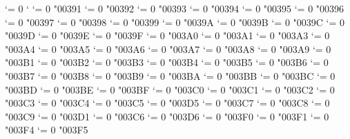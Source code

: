 {  \Umathcode `\z = 0 \alphafam `\z
  \Umathcode `\Α = 0 \alphafam "00391
  \Umathcode `\Β = 0 \alphafam "00392
  \Umathcode `\Γ = 0 \alphafam "00393
  \Umathcode `\Δ = 0 \alphafam "00394
  \Umathcode `\Ε = 0 \alphafam "00395
  \Umathcode `\Ζ = 0 \alphafam "00396
  \Umathcode `\Η = 0 \alphafam "00397
  \Umathcode `\Θ = 0 \alphafam "00398
  \Umathcode `\Ι = 0 \alphafam "00399
  \Umathcode `\Κ = 0 \alphafam "0039A
  \Umathcode `\Λ = 0 \alphafam "0039B
  \Umathcode `\Μ = 0 \alphafam "0039C
  \Umathcode `\Ν = 0 \alphafam "0039D
  \Umathcode `\Ξ = 0 \alphafam "0039E
  \Umathcode `\Ο = 0 \alphafam "0039F
  \Umathcode `\Π = 0 \alphafam "003A0
  \Umathcode `\Ρ = 0 \alphafam "003A1
  \Umathcode `\Σ = 0 \alphafam "003A3
  \Umathcode `\Τ = 0 \alphafam "003A4
  \Umathcode `\Υ = 0 \alphafam "003A5
  \Umathcode `\Φ = 0 \alphafam "003A6
  \Umathcode `\Χ = 0 \alphafam "003A7
  \Umathcode `\Ψ = 0 \alphafam "003A8
  \Umathcode `\Ω = 0 \alphafam "003A9
  \Umathcode `\α = 0 \alphafam "003B1
  \Umathcode `\β = 0 \alphafam "003B2
  \Umathcode `\γ = 0 \alphafam "003B3
  \Umathcode `\δ = 0 \alphafam "003B4
  \Umathcode `\ε = 0 \alphafam "003B5
  \Umathcode `\ζ = 0 \alphafam "003B6
  \Umathcode `\η = 0 \alphafam "003B7
  \Umathcode `\θ = 0 \alphafam "003B8
  \Umathcode `\ι = 0 \alphafam "003B9
  \Umathcode `\κ = 0 \alphafam "003BA
  \Umathcode `\λ = 0 \alphafam "003BB
  \Umathcode `\μ = 0 \alphafam "003BC
  \Umathcode `\ν = 0 \alphafam "003BD
  \Umathcode `\ξ = 0 \alphafam "003BE
  \Umathcode `\ο = 0 \alphafam "003BF
  \Umathcode `\π = 0 \alphafam "003C0
  \Umathcode `\ρ = 0 \alphafam "003C1
  \Umathcode `\ς = 0 \alphafam "003C2
  \Umathcode `\σ = 0 \alphafam "003C3
  \Umathcode `\τ = 0 \alphafam "003C4
  \Umathcode `\υ = 0 \alphafam "003C5
  \Umathcode `\φ = 0 \alphafam "003D5
  \Umathcode `\χ = 0 \alphafam "003C7
  \Umathcode `\ψ = 0 \alphafam "003C8
  \Umathcode `\ω = 0 \alphafam "003C9
  \Umathcode `\ϑ = 0 \alphafam "003D1
  \Umathcode `\ϕ = 0 \alphafam "003C6
  \Umathcode `\ϖ = 0 \alphafam "003D6
  \Umathcode `\ϰ = 0 \alphafam "003F0
  \Umathcode `\ϱ = 0 \alphafam "003F1
  \Umathcode `\ϴ = 0 \alphafam "003F4
  \Umathcode `\ϵ = 0 \alphafam "003F5
\fi
\tenrm}

